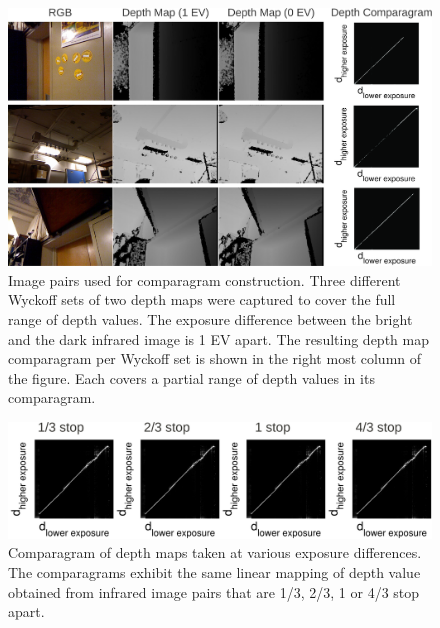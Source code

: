 \begin{figure}
\centering 
\includegraphics[width=6.5in]{ch4/diagrams/jason_depth.pdf} 
\caption{Image pairs used for comparagram construction. Three different Wyckoff sets of two depth maps were captured to cover the full range of depth values. The exposure difference between the bright and the dark infrared image is 1 EV apart. The resulting depth map comparagram per Wyckoff set is shown in the right most column of the figure. Each covers a partial range of depth values in its comparagram.} 
\label{fig_depth_parts} 
\end{figure}
\begin{figure} 
\centering \includegraphics[width=6.5in]{ch4/diagrams/jason_collection.pdf} 
\caption{Comparagram of depth maps taken at various exposure differences. The comparagrams exhibit the same linear mapping of depth value obtained from infrared image pairs that are 1/3, 2/3, 1 or 4/3 stop apart.}
\label{fig_various} 
\end{figure}


